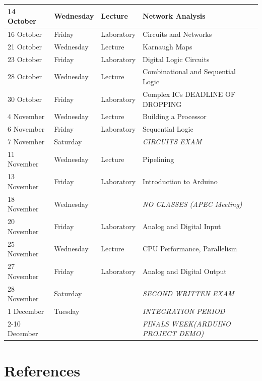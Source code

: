 \documentclass[9pt]{article}
\begin{document}
\begin{longtable}{|p{0.9in}|p{0.7in}|p{0.7in}|p{3in}|}
	\hline 14 October &	Wednesday	& Lecture &	Network Analysis\\
	\hline 16 October &	Friday	& Laboratory &	Circuits and Networks\\
	\hline 21 October &	Wednesday	& Lecture & 	Karnaugh Maps\\
	\hline 23 October &	Friday	& Laboratory &	Digital Logic Circuits\\
	\hline 28 October &	Wednesday	& Lecture &	Combinational and Sequential Logic\\
	\hline 30 October &	Friday	& Laboratory &	Complex ICs\newline
			DEADLINE OF DROPPING\\
	\hline 4 November &	Wednesday	& Lecture &	Building a Processor\\
	\hline 6 November &	Friday	& Laboratory &	Sequential Logic\\
	\hline 7 November &	Saturday &&	\textit{CIRCUITS EXAM}	\\
	\hline 11 November &	Wednesday &	Lecture &	Pipelining\\
	\hline 13 November &	Friday	& Laboratory &	Introduction to Arduino\\
	\hline 18 November &	Wednesday &	 &	\textit{NO CLASSES (APEC Meeting)}\\
	\hline 20 November &	Friday	& Laboratory &	Analog and Digital Input\\
	\hline 25 November &	Wednesday &	Lecture &	CPU Performance, Parallelism\\
	\hline 27 November &	Friday	& Laboratory &	Analog and Digital Output\\	
	\hline 28 November &	Saturday && \textit{SECOND WRITTEN EXAM}\\
	\hline 1 December &	Tuesday	&& \textit{INTEGRATION PERIOD}	\\
	\hline 2-10 December &&&		\textit{FINALS WEEK\newline (ARDUINO PROJECT DEMO)}	\\
	\hline
\end{longtable}
\section*{References}
\end{document}
